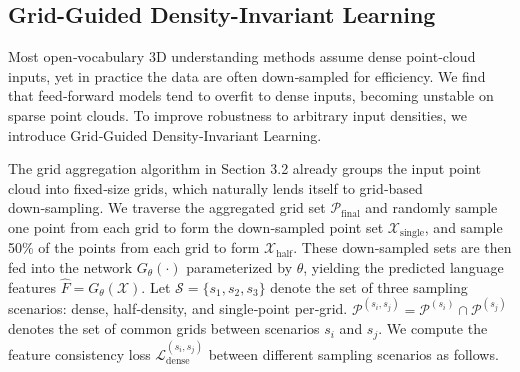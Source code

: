 \documentclass[runningheads]{llncs}
\begin{document}
\subsection{Grid-Guided Density-Invariant Learning}
Most open‑vocabulary 3D understanding methods assume dense point‑cloud inputs, yet in practice the data are often down‑sampled for efficiency. We find that feed‑forward models tend to overfit to dense inputs, becoming unstable on sparse point clouds. To improve robustness to arbitrary input densities, we introduce Grid‑Guided Density‑Invariant Learning.

The grid aggregation algorithm in Section 3.2 already groups the input point cloud into fixed‑size grids, which naturally lends itself to grid‑based down‑sampling. We traverse the aggregated grid set $\mathcal{P}_{\text{final}}$ and randomly sample one point from each grid to form the down‑sampled point set $\mathcal{X}_{\text{single}}$, and sample 50\% of the points from each grid to form $\mathcal{X}_{\text{half}}$. These down‑sampled sets are then fed into the network $G_{\theta}(\cdot)$ parameterized by $\theta$, yielding the predicted language features $\hat{F} = G_{\theta}(\mathcal{X})$. Let $\mathcal{S} = \{s_1, s_2, s_3\}$ denote the set of three sampling scenarios: dense, half‑density, and single‑point per‑grid. $\mathcal{P}^{(s_i,s_j)} = \mathcal{P}^{(s_i)} \cap \mathcal{P}^{(s_j)}$ denotes the set of common grids between scenarios $s_i$ and $s_j$. We compute the feature consistency loss $\mathcal{L}_{\text{dense}}^{(s_i,s_j)}$ between different sampling scenarios as follows.
\end{document}
